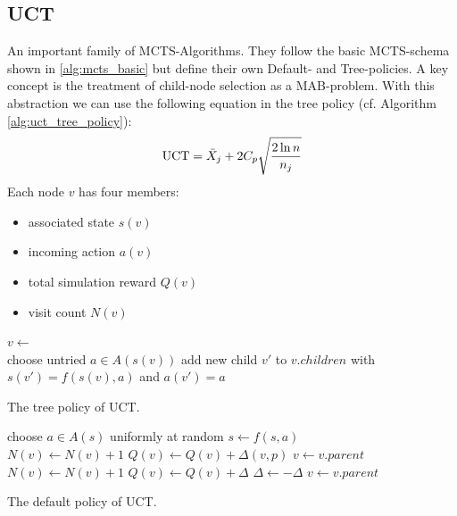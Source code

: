 \subsection{UCT}
\label{ss:uct}
An important family of MCTS-Algorithms. They follow the basic MCTS-schema shown in \ref{alg:mcts_basic} but define their own Default- and Tree-policies. A key concept is the treatment of child-node selection as a MAB-problem. With this abstraction we can use the following equation in the tree policy (cf. Algorithm \ref{alg:uct_tree_policy}):
\begin{equation}
    \text{UCT} = \Bar{X}_j + 2C_p\sqrt{\frac{2 \ln n}{n_j}}
\end{equation}
Each node $v$ has four members:
\begin{itemize}
    \item associated state $s(v)$
    \item incoming action $a(v)$
    \item total simulation reward $Q(v)$
    \item visit count $N(v)$
\end{itemize}
\begin{algorithm}[htbp]
\begin{algorithmic}
    \State {}
    \Else
    \State $v \gets$ 
    \EndIf
    \EndWhile
\EndFunction \\
\State choose untried $a \in A(s(v))$
\State add new child $v'$ to $v.children$ with $s(v') = f(s(v),a)$ and $a(v') = a$
\State {}
\EndFunction \\
\State {}
\EndFunction
\end{algorithmic}
\caption{The tree policy of UCT.}
\label{alg:uct_tree_policy}
\end{algorithm}
\begin{algorithm}[htbp]
\begin{algorithmic}
\State choose $a \in A(s)$ uniformly at random
\State $s \gets f(s,a)$
\EndWhile
\State {}
\EndFunction \\

 
\State $N(v) \gets N(v) + 1$
\State $Q(v) \gets Q(v) + \Delta(v,p)$
\State $v \gets v.parent$
\EndWhile
\State $N(v) \gets N(v) + 1$
\State $Q(v) \gets Q(v) + \Delta$
\State $\Delta \gets - \Delta$
\State $v \gets v.parent$
\EndFunction
\end{algorithmic}
\caption{The default policy of UCT.}
\label{alg:uct_default_policy}
\end{algorithm}